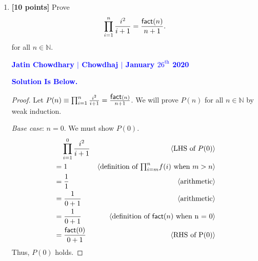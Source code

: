 \documentclass[11pt,fleqn]{article}
\newcommand{\mname}[1]{\mbox{\sf #1}}
\newcommand{\pnote}[1]{{\langle \text{#1} \rangle}}
\begin{document}
\begin{enumerate}

  \item \textbf{[10 points]} Prove \[\prod_{i = 1}^{n} \frac{i^2}{i +
    1} = \frac{\mname{fact}(n)}{n + 1}.\] for all $n \in \mathbb{N}$.

  \bigskip

  \textcolor{blue}{\textbf{Jatin Chowdhary $\vert$ Chowdhaj $\vert$ January $26^{\text{th}}$ 2020}}
  
  \textcolor{blue}{\textbf{Solution Is Below.}}
  
  \begin{proof}
  
Let $P(n) \equiv \prod^{n}_{i=1} \frac{i^2}{i + 1} = \frac{\mname{fact}(n)}{n + 1}$.  We will prove $P(n)$
for all $n \in \mathbb{N}$ by weak induction.

\medskip

\emph{Base case}: $n = 0$.  We must show $P(0)$.
\begin{align*}
  &\phantom{{}=} 
  \prod_{i=1}^{0} \frac{i^2}{i + 1}       & \pnote{LHS of $P(0)$}\\
  &= 1                                    & \pnote{definition of $\textstyle{\prod}_{i=m}^{n} f(i)$ when $m > n$}\\
  &= \frac{1}{1}                          & \pnote{arithmetic}\\
  &= \frac{1}{0 + 1}                      & \pnote{arithmetic}\\
  &= \frac{1}{0 + 1}                      & \pnote{definition of $\mname{fact}{(n)}$ when n = 0}\\
  &= \frac{\mname{fact}{(0)}}{0 + 1}      & \pnote{RHS of P(0)}
\end{align*}
Thus,  $P(0)$ holds.

\medskip


\end{proof}
\end{enumerate}
\end{document}
